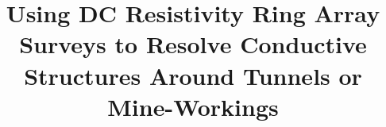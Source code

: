 \documentclass[preprint,authoryear,12pt]{elsarticle}
\begin{document}
\begin{frontmatter}



\title{Using DC Resistivity Ring Array Surveys to Resolve Conductive Structures Around Tunnels or Mine-Workings}








\end{frontmatter}
\end{document}
